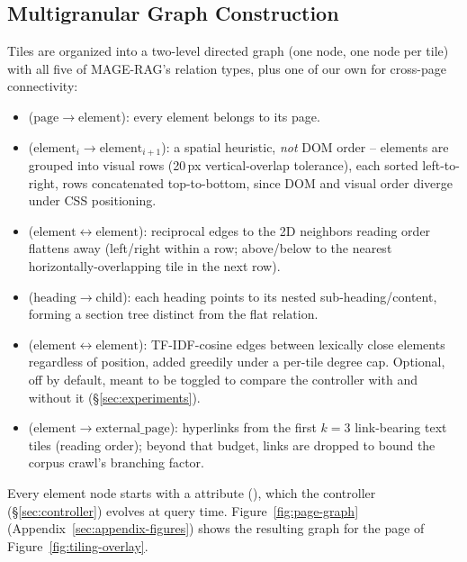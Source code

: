 \subsection{Multigranular Graph Construction}
\label{sec:graph}

Tiles are organized into a two-level directed graph (one  node, one  node per tile) with all five of MAGE-RAG's relation types, plus one of our own for cross-page connectivity:
\begin{itemize}
\item \textbf{} ($\mathrm{page}\to\mathrm{element}$): every element belongs to its page.
\item \textbf{} ($\mathrm{element}_i\to\mathrm{element}_{i+1}$): a spatial heuristic, \emph{not} DOM order -- elements are grouped into visual rows (20\,px vertical-overlap tolerance), each sorted left-to-right, rows concatenated top-to-bottom, since DOM and visual order diverge under CSS positioning.
\item \textbf{} ($\mathrm{element}\leftrightarrow\mathrm{element}$): reciprocal edges to the 2D neighbors reading order flattens away (left/right within a row; above/below to the nearest horizontally-overlapping tile in the next row).
\item \textbf{} ($\mathrm{heading}\to\mathrm{child}$): each heading points to its nested sub-heading/content, forming a section tree distinct from the flat  relation.
\item \textbf{} ($\mathrm{element}\leftrightarrow\mathrm{element}$): TF-IDF-cosine edges between lexically close elements regardless of position, added greedily under a per-tile degree cap. Optional, off by default, meant to be toggled to compare the controller with and without it (\S\ref{sec:experiments}).
\item \textbf{} ($\mathrm{element}\to\mathrm{external\_page}$): hyperlinks from the first $k{=}3$ link-bearing text tiles (reading order); beyond that budget, links are dropped to bound the corpus crawl's branching factor.
\end{itemize}
Every element node starts with a  attribute (), which the controller (\S\ref{sec:controller}) evolves at query time. Figure~\ref{fig:page-graph} (Appendix~\ref{sec:appendix-figures}) shows the resulting graph for the page of Figure~\ref{fig:tiling-overlay}.

